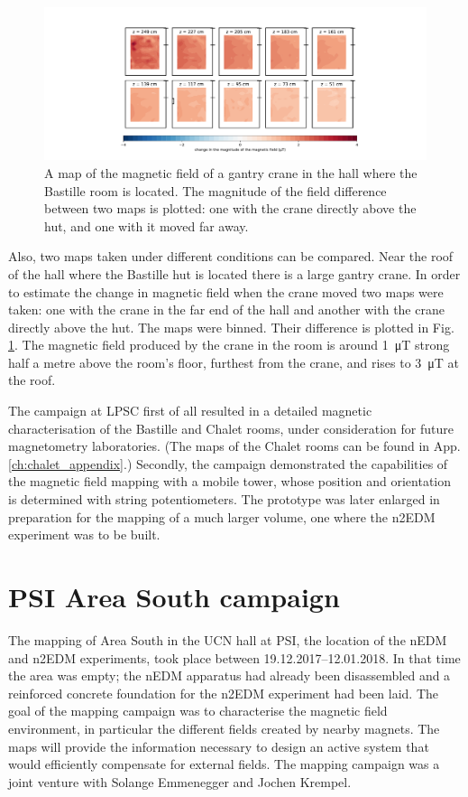 \begin{figure}
  \centering
  \includegraphics[width=\linewidth]{gfx/mapping/lpsc/bastille_crane_change_magnitude_crop.pdf}
  \caption{A map of the magnetic field of a gantry crane in the hall where the Bastille room is located.
  The magnitude of the field difference between two maps is plotted: one with the crane directly above the hut, and one with it moved far away.}\label{fig:mapping_bastille_crane_change}
\end{figure}

Also, two maps taken under different conditions can be compared.
Near the roof of the hall where the Bastille hut is located there is a large gantry crane.
In order to estimate the change in magnetic field when the crane moved two maps were taken: one with the crane in the far end of the hall and another with the crane directly above the hut.
The maps were binned.
Their difference is plotted in Fig.\,\ref{fig:mapping_bastille_crane_change}.
The magnetic field produced by the crane in the room is around \SI{1}{\micro\tesla} strong half a metre above the room's floor, furthest from the crane, and rises to \SI{3}{\micro\tesla} at the roof.

The campaign at LPSC first of all resulted in a detailed magnetic characterisation of the Bastille and Chalet rooms, under consideration for future magnetometry laboratories.
(The maps of the Chalet rooms can be found in App.\,\ref{ch:chalet_appendix}.)
Secondly, the campaign demonstrated the capabilities of the magnetic field mapping with a mobile tower, whose position and orientation is determined with string potentiometers.
The prototype was later enlarged in preparation for the mapping of a much larger volume, one where the n2EDM experiment was to be built.




\section{PSI Area South campaign}
The mapping of Area South in the UCN hall at PSI, the location of the nEDM and n2EDM experiments, took place between 19.12.2017--12.01.2018.
In that time the area was empty; the nEDM apparatus had already been disassembled and a reinforced concrete foundation for the n2EDM experiment had been laid.
The goal of the mapping campaign was to characterise the magnetic field environment, in particular the different fields created by nearby magnets.
The maps will provide the information necessary to design an active system that would efficiently compensate for external fields.
The mapping campaign was a joint venture with Solange Emmenegger and Jochen Krempel.

